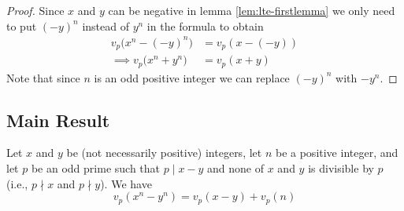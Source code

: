 \documentclass[main.tex]{subfile}
\begin{document}
    \begin{proof}
        Since $x$ and $y$ can be negative in lemma \eqref{lem:lte-firstlemma} we only need to put $(-y)^n$ instead of $y^n$ in the formula to obtain
	         \begin{align*}
		         v_p\big( x^n - (-y)^n \big)
		         	& = v_p ( x - (-y))\\
		         \implies v_p\big(x^n + y^n\big)
		         	& = v_p(x+y)
	         \end{align*}
        Note that since $n$ is an odd positive integer we can replace $(-y)^n$ with $-y^n$.
    \end{proof}

\subsection{Main Result}

    \begin{theorem}\label{theorem1}
        Let $ x$ and $y$ be (not necessarily positive) integers, let $n$ be a positive integer, and let $p$ be an odd prime such that $ p \mid x - y$ and none of
        $x$ and $y$ is divisible by $p$ (i.e., $p \nmid x$ and $p \nmid y$).  We have
        \[ v_p(  x^n - y^n ) = v_p(  x - y ) + v_p  (n )\]
    \end{theorem}
\end{document}
